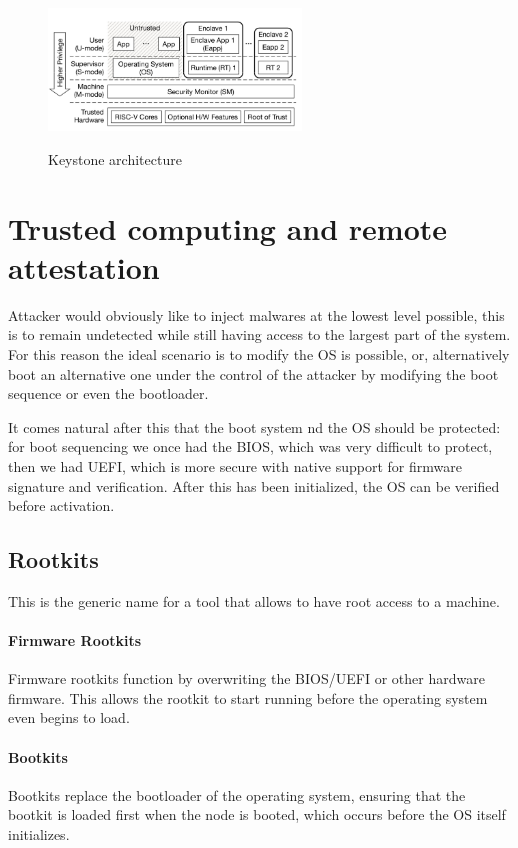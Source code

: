 \begin{figure}[H]
  \centering
  \includegraphics[width=0.6\textwidth]{img/keystone architecture.png}
  \label{fig:keystone}
  \caption{Keystone architecture}
\end{figure}

\section{Trusted computing and remote attestation}
Attacker would obviously like to inject malwares at the lowest level
possible, this is to remain undetected while still having access to
the largest part of the system. For this reason the ideal scenario is
to modify the OS is possible, or, alternatively boot an alternative
one under the control of the attacker by modifying the boot sequence
or even the bootloader.

It comes natural after this that the boot system nd the OS should be
protected: for boot sequencing we once had the BIOS, which was 
very difficult to protect, then we had UEFI, which is more secure with
native support for firmware signature and verification. After this has
been initialized, the OS can be verified before activation.

\subsection{Rootkits}
This is the generic name for a tool that allows to have root access to
a machine.

\paragraph{Firmware Rootkits} Firmware rootkits function by
overwriting the BIOS/UEFI or other hardware firmware. This allows the
rootkit to start running before the operating system even begins to
load.

\paragraph{Bootkits} Bootkits replace the bootloader of the operating
system, ensuring that the bootkit is loaded first when the node is
booted, which occurs before the OS itself initializes.

